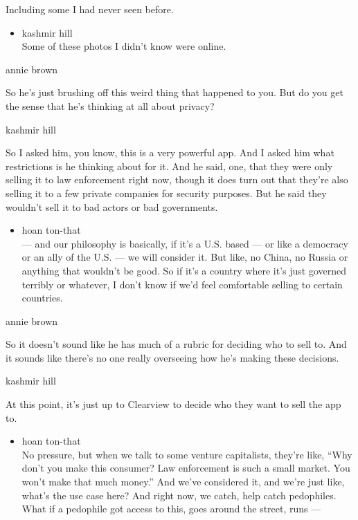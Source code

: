 Including some I had never seen before.

\begin{itemize}
\tightlist
\item
  kashmir hill\\
  Some of these photos I didn't know were online.
\end{itemize}

annie brown

So he's just brushing off this weird thing that happened to you. But do
you get the sense that he's thinking at all about privacy?

kashmir hill

So I asked him, you know, this is a very powerful app. And I asked him
what restrictions is he thinking about for it. And he said, one, that
they were only selling it to law enforcement right now, though it does
turn out that they're also selling it to a few private companies for
security purposes. But he said they wouldn't sell it to bad actors or
bad governments.

\begin{itemize}
\tightlist
\item
  hoan ton-that\\
  --- and our philosophy is basically, if it's a U.S. based --- or like
  a democracy or an ally of the U.S. --- we will consider it. But like,
  no China, no Russia or anything that wouldn't be good. So if it's a
  country where it's just governed terribly or whatever, I don't know if
  we'd feel comfortable selling to certain countries.
\end{itemize}

annie brown

So it doesn't sound like he has much of a rubric for deciding who to
sell to. And it sounds like there's no one really overseeing how he's
making these decisions.

kashmir hill

At this point, it's just up to Clearview to decide who they want to sell
the app to.

\begin{itemize}
\tightlist
\item
  hoan ton-that\\
  No pressure, but when we talk to some venture capitalists, they're
  like, ``Why don't you make this consumer? Law enforcement is such a
  small market. You won't make that much money.'' And we've considered
  it, and we're just like, what's the use case here? And right now, we
  catch, help catch pedophiles. What if a pedophile got access to this,
  goes around the street, runs ---
\end{itemize}

